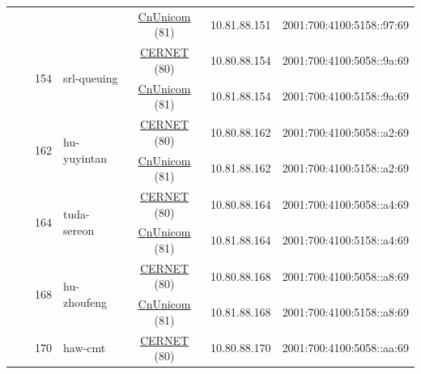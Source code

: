 \begin{small}
\begin{center}
\begin{longtable}{|c|c|c|c|c|c|c|c|}
  &  &  &  & \multicolumn{2}{|c|}{\tiny{\href{http://www.chinaunicom.com}{CnUnicom} (81)}} & \tiny{10.81.88.151} & \tiny{2001:700:4100:5158::97:69} \\* \cline{3-3}\cline{4-4}\cline{5-5}\cline{6-6}\cline{7-7}\cline{8-8}
  &  & \multirow{2}{*}{\tiny{154}} & \multicolumn{1}{|l|}{\multirow{2}{*}{\tiny{srl-queuing}}} & \multicolumn{2}{|c|}{\tiny{\href{http://www.cernet.edu.cn}{CERNET} (80)}} & \tiny{10.80.88.154} & \tiny{2001:700:4100:5058::9a:69} \\* \cline{5-5}\cline{6-6}\cline{7-7}\cline{8-8}
  &  &  &  & \multicolumn{2}{|c|}{\tiny{\href{http://www.chinaunicom.com}{CnUnicom} (81)}} & \tiny{10.81.88.154} & \tiny{2001:700:4100:5158::9a:69} \\* \cline{3-3}\cline{4-4}\cline{5-5}\cline{6-6}\cline{7-7}\cline{8-8}
  &  & \multirow{2}{*}{\tiny{162}} & \multicolumn{1}{|l|}{\multirow{2}{*}{\tiny{hu-yuyintan}}} & \multicolumn{2}{|c|}{\tiny{\href{http://www.cernet.edu.cn}{CERNET} (80)}} & \tiny{10.80.88.162} & \tiny{2001:700:4100:5058::a2:69} \\* \cline{5-5}\cline{6-6}\cline{7-7}\cline{8-8}
  &  &  &  & \multicolumn{2}{|c|}{\tiny{\href{http://www.chinaunicom.com}{CnUnicom} (81)}} & \tiny{10.81.88.162} & \tiny{2001:700:4100:5158::a2:69} \\* \cline{3-3}\cline{4-4}\cline{5-5}\cline{6-6}\cline{7-7}\cline{8-8}
  &  & \multirow{2}{*}{\tiny{164}} & \multicolumn{1}{|l|}{\multirow{2}{*}{\tiny{tuda-sereon}}} & \multicolumn{2}{|c|}{\tiny{\href{http://www.cernet.edu.cn}{CERNET} (80)}} & \tiny{10.80.88.164} & \tiny{2001:700:4100:5058::a4:69} \\* \cline{5-5}\cline{6-6}\cline{7-7}\cline{8-8}
  &  &  &  & \multicolumn{2}{|c|}{\tiny{\href{http://www.chinaunicom.com}{CnUnicom} (81)}} & \tiny{10.81.88.164} & \tiny{2001:700:4100:5158::a4:69} \\* \cline{3-3}\cline{4-4}\cline{5-5}\cline{6-6}\cline{7-7}\cline{8-8}
  &  & \multirow{2}{*}{\tiny{168}} & \multicolumn{1}{|l|}{\multirow{2}{*}{\tiny{hu-zhoufeng}}} & \multicolumn{2}{|c|}{\tiny{\href{http://www.cernet.edu.cn}{CERNET} (80)}} & \tiny{10.80.88.168} & \tiny{2001:700:4100:5058::a8:69} \\* \cline{5-5}\cline{6-6}\cline{7-7}\cline{8-8}
  &  &  &  & \multicolumn{2}{|c|}{\tiny{\href{http://www.chinaunicom.com}{CnUnicom} (81)}} & \tiny{10.81.88.168} & \tiny{2001:700:4100:5158::a8:69} \\* \cline{3-3}\cline{4-4}\cline{5-5}\cline{6-6}\cline{7-7}\cline{8-8}
  &  & \multirow{2}{*}{\tiny{170}} & \multicolumn{1}{|l|}{\multirow{2}{*}{\tiny{haw-cmt}}} & \multicolumn{2}{|c|}{\tiny{\href{http://www.cernet.edu.cn}{CERNET} (80)}} & \tiny{10.80.88.170} & \tiny{2001:700:4100:5058::aa:69} \\* \cline{5-5}\cline{6-6}\cline{7-7}\cline{8-8}

\end{longtable}
\end{center}
\end{small}
